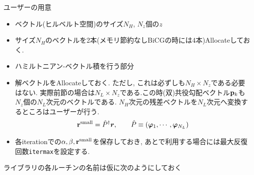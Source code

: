 \documentclass[12pt,titlepage]{jarticle}
\begin{document}
ユーザーの用意
\begin{itemize}
\item ベクトル(ヒルベルト空間)のサイズ$N_H$, $N_z$個の$z$
\item サイズ$N_H$のベクトルを2本(メモリ節約なしBiCGの時には4本)Allocateしておく.
\item ハミルトニアン-ベクトル積を行う部分
\item 解ベクトルをAllocateしておく. ただし, これは必ずしも$N_H \times N_z$である必要はない.
  実際前節の場合は$N_L \times N_z$である.この時(双)共役勾配ベクトル${{\bf p}_k}$も
  $N_z$個の$N_L$次元のベクトルである.
  $N_H$次元の残差ベクトルを$N_L$次元へ変換するところはユーザーが行う.
  \begin{align}
    {\bf r}^{\rm small} = {\hat P}^\dagger {\boldsymbol r}, \qquad
    {\hat P} \equiv ({\boldsymbol \varphi}_1, \cdots, {\boldsymbol \varphi}_{N_L})
  \end{align}
\item 各iterationでの$\alpha, \beta, {\bf r}^{\rm small}$を保存しておき, 
あとで利用する場合には最大反復回数\verb|itermax|を設定する.
\end{itemize}
ライブラリの各ルーチンの名前は仮に次のようにしておく
\end{document}
